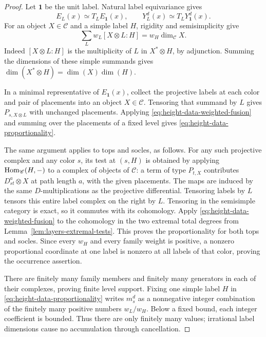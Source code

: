 \begin{proof}
Let $\mathbf1$ be the unit label.  Natural label equivariance
gives
\[
 E_L(x)\simeq T_L E_{\mathbf1}(x),\qquad
 Y_L^d(x)\simeq T_LY_{\mathbf1}^d(x).
\]
For an object $X\in\mathscr C$ and a simple label $H$, rigidity
and semisimplicity give
\begin{equation}
 \sum_L w_L[X\otimes L:H]
       =w_H\dim_{\mathscr C}X.
 \label{eq:height-data-weighted-fusion}
\end{equation}
Indeed $[X\otimes L:H]$ is the multiplicity of $L$ in
$X^*\otimes H$, by adjunction.  Summing the dimensions of these
simple summands gives
$\dim(X^*\otimes H)=\dim(X)\dim(H)$.

In a minimal representative of $E_{\mathbf1}(x)$, collect the
projective labels at each color and pair of placements into an
object $X\in\mathscr C$.  Tensoring that summand by $L$ gives
$P_{s,X\otimes L}$ with unchanged placements.  Applying
\eqref{eq:height-data-weighted-fusion} and summing over the
placements of a fixed level gives
\eqref{eq:height-data-proportionality}.

The same argument applies to tops and socles, as follows.  For
any such projective complex and any color $s$, its test at
$(s,H)$ is obtained by applying $\operatorname{Hom}_{\mathscr C}(H,-)$ to a
complex of objects of $\mathscr C$: a term of type $P_{t,X}$
contributes $D^a_{st}\otimes X$ at path length $a$, with the
given placements.  The maps are induced by the same
$D$-multiplications as the projective differential.  Tensoring
labels by $L$ tensors this entire label complex on the right
by $L$.  Tensoring in the semisimple category is exact, so it
commutes with its cohomology.  Apply
\eqref{eq:height-data-weighted-fusion} to the cohomology in the
two extremal total degrees from
Lemma~\ref{lem:layers-extremal-tests}.  This proves the
proportionality for both tops and socles.  Since every $w_H$
and every family weight is positive, a nonzero proportional
coordinate at one label is nonzero at all labels of that
color, proving the occurrence assertion.

There are finitely many family members and finitely many
generators in each of their complexes, proving finite level
support.  Fixing one simple label $H$ in
\eqref{eq:height-data-proportionality} writes $m_s^d$ as a
nonnegative integer combination of the finitely many positive
numbers $w_L/w_H$.  Below a fixed bound, each integer
coefficient is bounded.  Thus there are only finitely many
values; irrational label dimensions cause no accumulation
through cancellation.


\end{proof}
